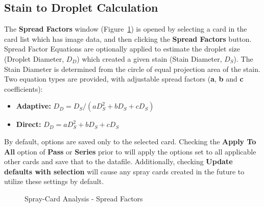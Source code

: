 \documentclass[10pt,letterpaper,titlepage]{article}
\begin{document}
    \subsection{Stain to Droplet Calculation}
    \label{sec:spread_factors}
    The \textbf{Spread Factors} window (Figure~\ref{fig:card_spread_factors}) is opened by selecting a card in the card list which has image data, and then clicking the \textbf{Spread Factors} button. Spread Factor Equations are optionally applied to estimate the droplet size (Droplet Diameter, $D_D$) which created a given stain (Stain Diameter, $D_S$). The Stain Diameter is determined from the circle of equal projection area of the stain. Two equation types are provided, with adjustable spread factors (\textbf{a}, \textbf{b} and \textbf{c} coefficients):
    \begin{itemize}
        \item \textbf{Adaptive:} $D_D = D_S / (aD_S^2+bD_S+cD_S)$
        \item \textbf{Direct:} $D_D = aD_S^2+bD_S+cD_S$
    \end{itemize}
    By default, options are saved only to the selected card. Checking the \textbf{Apply To All} option of \textbf{Pass} or \textbf{Series} prior to will apply the options set to all applicable other cards and save that to the datafile. Additionally, checking \textbf{Update defaults with selection} will cause any spray cards created in the future to utilize these settings by default.
    \begin{figure}[hb]
        \centering
        \caption{Spray-Card Analysis - Spread Factors}
        \label{fig:card_spread_factors}
    \end{figure}
    \FloatBarrier
\end{document}
